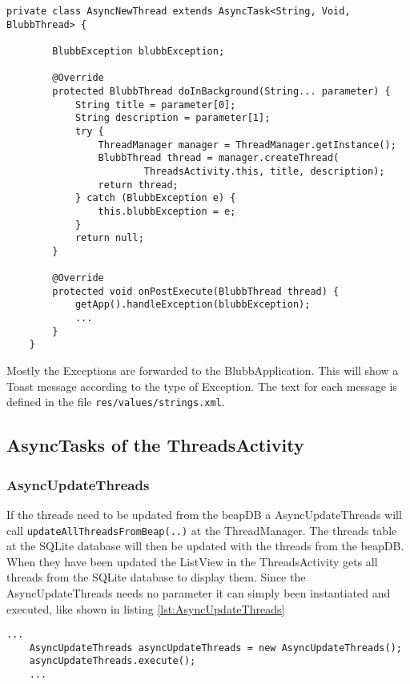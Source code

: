 \documentclass[12pt,a4paper,oneside]{report}
\newcommand{\beapDB}{beapDB}
\newcommand{\code}[1]{\lstinline{#1}}
\begin{document}
\begin{lstlisting}[caption=Exception handling in AsyncTasks, label=lst:Exception]
private class AsyncNewThread extends AsyncTask<String, Void, BlubbThread> {
        
        BlubbException blubbException;

        @Override
        protected BlubbThread doInBackground(String... parameter) {
            String title = parameter[0];
            String description = parameter[1];
            try {
            	ThreadManager manager = ThreadManager.getInstance();
            	BlubbThread thread = manager.createThread(
                        ThreadsActivity.this, title, description);
                return thread;
            } catch (BlubbException e) {
                this.blubbException = e;
            }
            return null;
        }
        
        @Override
        protected void onPostExecute(BlubbThread thread) {
            getApp().handleException(blubbException);
        	...
        }
	}
\end{lstlisting}

Mostly the Exceptions are forwarded to the BlubbApplication. This will show a Toast message according to the type of Exception. The text for each message is defined in the file \code{res/values/strings.xml}.

\subsection{AsyncTasks of the ThreadsActivity}

\subsubsection{AsyncUpdateThreads}
\label{AsyncUpdateThreads}

If the threads need to be updated from the \beapDB{} a AsyncUpdateThreads will call \code{updateAllThreadsFromBeap(..)} at the ThreadManager. The threads table at the SQLite database will then be updated with the threads from the beapDB. When they have been updated the ListView in the ThreadsActivity gets all threads from the SQLite database to display them.
Since the AsyncUpdateThreads needs no parameter it can simply been instantiated and executed, like shown in listing \ref{lst:AsyncUpdateThreads}

\begin{lstlisting}[caption=AsyncUpdateThreads, label=lst:AsyncUpdateThreads]
	...
	AsyncUpdateThreads asyncUpdateThreads = new AsyncUpdateThreads();
	asyncUpdateThreads.execute();
	...
\end{lstlisting}
\end{document}
